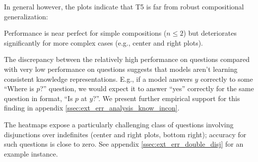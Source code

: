In general however, the plots indicate that T5 is far from robust compositional generalization:

 Performance is near perfect for simple compositions ($n \leq 2$) but deteriorates significantly for more complex cases (e.g., center and right plots).

 The discrepancy between the relatively high performance on \wherep questions compared with very low performance on \yesno questions suggests that models aren't learning consistent knowledge representations. E.g., if a model answers $y$ correctly to some ``Where is $p$?'' question, we would expect it to answer ``yes'' correctly for the same question in \yesno format, ``Is $p$ at $y$?''. We present further empirical support for this finding in appendix \ref{ssec:ext_err_analysis_know_incon}.

 The heatmaps expose a particularly challenging class of \yesno questions involving disjunctions over indefinites (center and right plots, bottom right); accuracy for such questions is close to zero. See appendix \ref{ssec:ext_err_double_disj} for an example instance.




























    

















